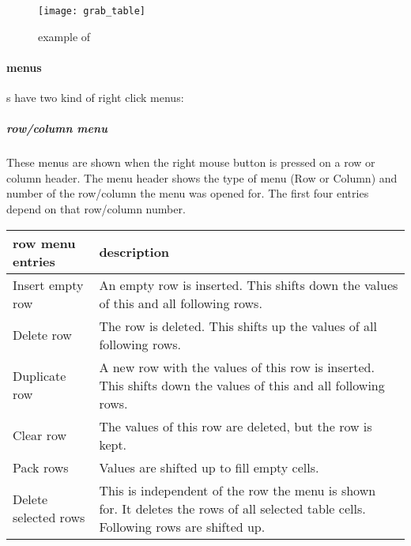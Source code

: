 \vspace{1cm}

\begin{figure}[H]\label{fig:tables}
  \begin{center}
    \texttt{[image: grab\_table]}
  \end{center}
\caption{example of \TABLE}
\end{figure}

\paragraph{\TABLE{} menus}
\label{par:uitablemenu}

\INTENS{} \TABLE{}s have two kind of right click menus:

\subparagraph{row/column menu}
\label{par:uitablemenurowcolumn}

These menus are shown when the right mouse button is pressed on a row or column header.
The menu header shows the type of menu (Row or Column) and number of the row/column the menu was opened for.
The first four entries depend on that row/column number.

\begin{tabularx}{\textwidth}{l|X}
  row menu entries        & description \\
\hline
Insert empty row          & An empty row is inserted.
                            This shifts down the values of this and all following rows. \\
Delete row                & The row is deleted.
                            This shifts up the values of all following rows. \\
Duplicate row             & A new row with the values of this row is inserted.
                            This shifts down the values of this and all following rows. \\
Clear row                 & The values of this row are deleted, but the row is kept. \\
\hline
Pack rows                 & Values are shifted up to fill empty cells. \\
Delete selected rows      & This is independent of the row the menu is shown for.
                            It deletes the rows of all selected table cells.
                            Following rows are shifted up. \\
\end{tabularx}


